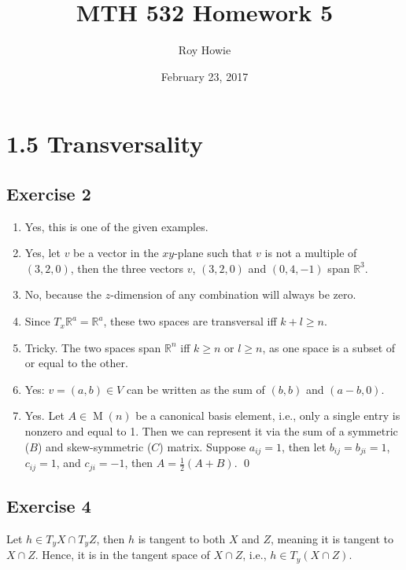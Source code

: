 \documentclass{article}
\newcommand{\R}{\mathbb{R}}
\DeclareMathOperator{\M}{M}
\begin{document}
\title{\vspace{-2cm}MTH 532 Homework 5}
\author{Roy Howie}
\date{February 23, 2017}
\maketitle

\section*{1.5 Transversality}
  \subsection*{Exercise 2}
    \begin{enumerate}[label=\textbf{(\alph*)}]
      \item{
        Yes, this is one of the given examples.
      }
      \item {
        Yes, let $v$ be a vector in the $xy$-plane such that $v$ is not a
        multiple of $(3,2,0)$, then the three vectors $v$, $(3,2,0)$ and $(0,4,
        -1)$ span $\R^3$.
      }
      \item {
        No, because the $z$-dimension of any combination will always be zero.
      }
      \item {
        Since $T_x\R^a=\R^a$, these two spaces are transversal iff $k+l\geq n$.
      }
      \item {
        Tricky. The two spaces span $\R^n$ iff $k\geq n$ or $l\geq n$, as one
        space is a subset of or equal to the other.
      }
      \item {
        Yes: $v=(a,b)\in V$ can be written as the sum of $(b,b)$ and $(a-b,0)$.
      }
      \item {
        Yes. Let $A\in\M(n)$ be a canonical basis element, i.e., only a single
        entry is nonzero and equal to 1. Then we can represent it via the sum
        of a symmetric ($B$) and skew-symmetric ($C$) matrix. Suppose $a_{ij}
        =1$, then let $b_{ij}=b_{ji}=1$, $c_{ij}=1$, and $c_{ji}=-1$, then
        $A=\frac{1}{2}(A+B)$.
      }
      \qed
    \end{enumerate}

  \subsection*{Exercise 4}
    Let $h\in T_yX\cap T_yZ$, then $h$ is tangent to both $X$ and $Z$, meaning
    it is tangent to $X\cap Z$. Hence, it is in the tangent space of $X\cap Z$,
    i.e., $h\in T_y(X\cap Z)$.
\end{document}
